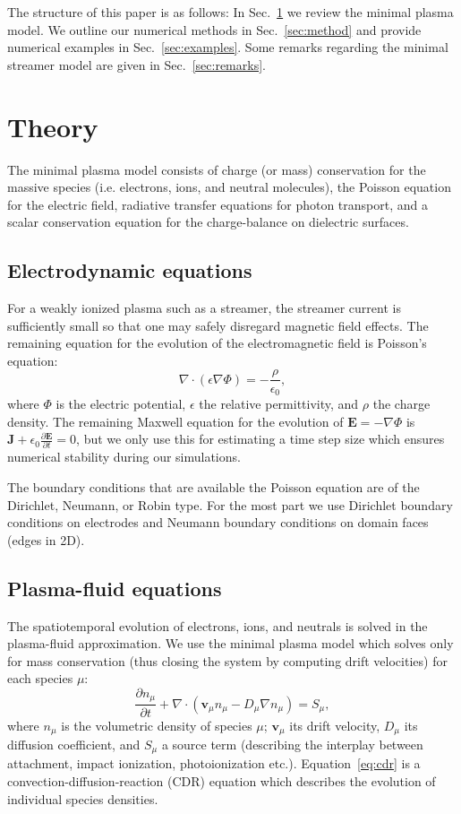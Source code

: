 \documentclass[3p]{elsarticle}
\begin{document}
The structure of this paper is as follows: In Sec.~\ref{sec:theory} we review the minimal plasma model. We outline our numerical methods in Sec.~\ref{sec:method} and provide numerical examples in Sec.~\ref{sec:examples}. Some remarks regarding the minimal streamer model are given in Sec.~\ref{sec:remarks}. 

\section{Theory}
\label{sec:theory}
The minimal plasma model consists of charge (or mass) conservation for the massive species (i.e. electrons, ions, and neutral molecules), the Poisson equation for the electric field, radiative transfer equations for photon transport, and a scalar conservation equation for the charge-balance on dielectric surfaces. 

\subsection{Electrodynamic equations}
\label{subsec:electrodynamic}
For a weakly ionized plasma such as a streamer, the streamer current is sufficiently small so that one may safely disregard magnetic field effects. The remaining equation for the evolution of the electromagnetic field is Poisson's equation:
\begin{equation}
  \nabla\cdot\left(\epsilon\nabla\Phi\right) = -\frac{\rho}{\epsilon_0},
\end{equation}
where $\Phi$ is the electric potential, $\epsilon$ the relative permittivity, and $\rho$ the charge density. The remaining Maxwell equation for the evolution of $\bm{E} = -\nabla\Phi$ is $\bm{J} + \epsilon_0\frac{\partial\bm{E}}{\partial t} = 0$, but we only use this for estimating a time step size which ensures numerical stability during our simulations. 

The boundary conditions that are available the Poisson equation are of the Dirichlet, Neumann, or Robin type. For the most part we use Dirichlet boundary conditions on electrodes and Neumann boundary conditions on domain faces (edges in 2D). 

\subsection{Plasma-fluid equations}
The spatiotemporal evolution of electrons, ions, and neutrals is solved in the plasma-fluid approximation. We use the minimal plasma model which solves only for mass conservation (thus closing the system by computing drift velocities) for each species $\mu$:
\begin{equation}
  \label{eq:cdr}
  \frac{\partial n_\mu}{\partial t} + \nabla\cdot(\bm{v}_\mu n_\mu - D_\mu\nabla n_\mu) = S_\mu,
\end{equation}
where $n_\mu$ is the volumetric density of species $\mu$; $\bm{v}_\mu$ its drift velocity, $D_\mu$ its diffusion coefficient, and $S_\mu$ a source term (describing the interplay between attachment, impact ionization, photoionization etc.). Equation~\eqref{eq:cdr} is a convection-diffusion-reaction (CDR) equation which describes the evolution of individual species densities.
\end{document}
